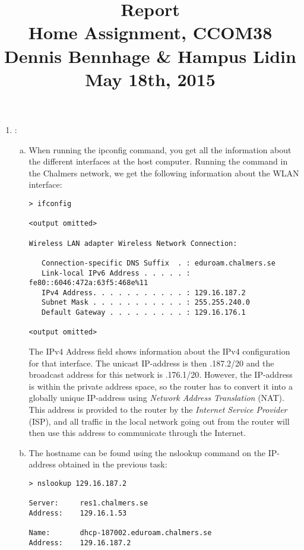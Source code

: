 \documentclass[a4paper,9pt,fleqn]{article}
\title{
{\bf Report}\\
\vspace{0.2cm}
%
Home Assignment, CCOM38\\
\vspace{1cm}
%
{\large Dennis Bennhage \& Hampus Lidin}\\
\vspace{10cm}
%
May 18th, 2015
}
\date{}
\begin{document}
\maketitle

\newpage

\begin{enumerate}[{Task} 1]
\item :
\begin{enumerate}[a)]
\item 
When running the {\outp ipconfig} command, you get all the
information about the different interfaces at the host computer. Running the
command in the Chalmers network, we get the following information
about the {\outp WLAN} interface:
			
\begin{lstlisting}
> ifconfig

<output omitted>

Wireless LAN adapter Wireless Network Connection:

   Connection-specific DNS Suffix  . : eduroam.chalmers.se
   Link-local IPv6 Address . . . . . : fe80::6046:472a:63f5:468e%11
   IPv4 Address. . . . . . . . . . . : 129.16.187.2
   Subnet Mask . . . . . . . . . . . : 255.255.240.0
   Default Gateway . . . . . . . . . : 129.16.176.1

<output omitted>
\end{lstlisting}

The {\outp IPv4 Address} field shows information about the IPv4 configuration for that
interface. The unicast IP-address is then {.187.2/20} and the
broadcast address for this network is {.176.1/20}. However, the
IP-address is within the private address space, so the router has to
convert it into a globally unique IP-address using {\it Network Address
Translation} (NAT). This address is provided to the router by the {\it Internet
Service Provider} (ISP), and all traffic in the local network going out
from the router will then use this address to communicate through the
Internet.
    
\item 
The hostname can be found using the {\outp nslookup} command on the IP-address
obtained in the previous task:

\begin{lstlisting}
> nslookup 129.16.187.2

Server:		res1.chalmers.se
Address:	129.16.1.53

Name:		dhcp-187002.eduroam.chalmers.se
Address:	129.16.187.2
\end{lstlisting}


\end{enumerate}
\end{enumerate}
\end{document}
